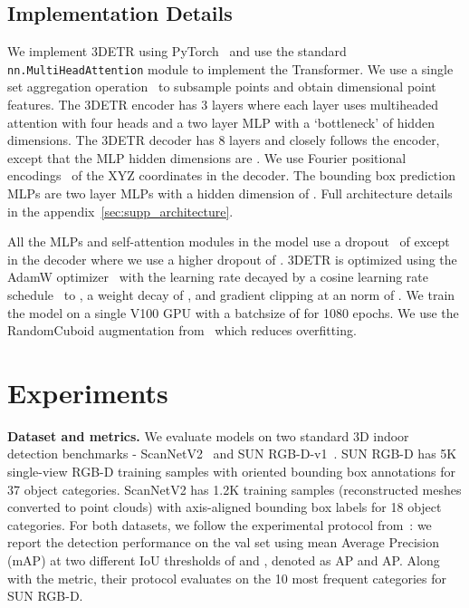 \documentclass[10pt,twocolumn,letterpaper]{article}
\newcommand{\OURS}{3DETR\xspace}
\newcommand{\sunrgbd}{SUN RGB-D\xspace}
\newcommand{\scannet}{ScanNetV2\xspace}
\begin{document}
 \vspace{-0.05in}
\subsection{Implementation Details}
\vspace{-0.05in}
We implement \OURS using PyTorch~\cite{NEURIPS2019_9015} and use the standard \texttt{nn.MultiHeadAttention} module to implement the Transformer.
We use a single set aggregation operation~\cite{qi2017pointnet++} to subsample  points and obtain  dimensional point features.
The \OURS encoder has 3 layers where each layer uses multiheaded attention with four heads and a two layer MLP with a `bottleneck' of  hidden dimensions.
The \OURS decoder has 8 layers and closely follows the encoder, except that the MLP hidden dimensions are .
We use Fourier positional encodings~\cite{tancik2020fourfeat} of the XYZ coordinates in the decoder.
The bounding box prediction MLPs are two layer MLPs with a hidden dimension of .
Full architecture details in the appendix~\cref{sec:supp_architecture}.

All the MLPs and self-attention modules in the model use a dropout~\cite{srivastava2014dropout} of  except in the decoder where we use a higher dropout of .
\OURS is optimized using the AdamW optimizer~\cite{loshchilov2017decoupled} with the learning rate decayed by a cosine learning rate schedule~\cite{loshchilov2016sgdr} to , a weight decay of , and gradient clipping at an  norm of .
We train the model on a single V100 GPU with a batchsize of  for 1080 epochs.
We use the RandomCuboid augmentation from~\cite{zhang_depth_contrast} which reduces overfitting.


\vspace{-0.05in}
\section{Experiments}
\label{sec:experiments}
\vspace{-0.05in}

\par \noindent \textbf{Dataset and metrics.}
We evaluate models on two standard 3D indoor detection benchmarks - \scannet~\cite{Dai_2017_CVPR_scannet} and \sunrgbd-v1~\cite{song2015sun}.
\sunrgbd has 5K single-view RGB-D training samples with oriented bounding box annotations for 37 object categories.
\scannet has 1.2K training samples (reconstructed meshes converted to point clouds) with axis-aligned bounding box labels for 18 object categories.
For both datasets, we follow the experimental protocol from~\cite{qi2019votenet}:
we report the detection performance on the val set using mean Average Precision (mAP) at two different IoU thresholds of  and , denoted as AP and AP.
Along with the metric, their protocol evaluates on the 10 most frequent categories for \sunrgbd.
\end{document}

